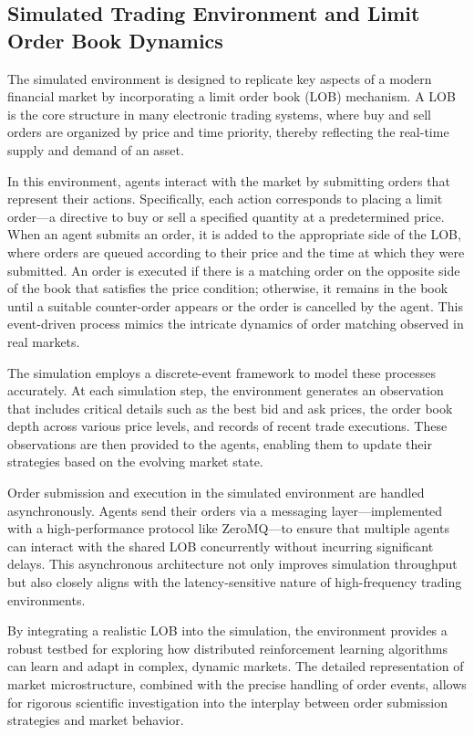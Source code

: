 \subsection{Simulated Trading Environment and Limit Order Book Dynamics}

The simulated environment is designed to replicate key aspects of a modern financial market by incorporating a limit order book (LOB) mechanism.
A LOB is the core structure in many electronic trading systems, where buy and sell orders are organized by price and time priority,
thereby reflecting the real-time supply and demand of an asset.

In this environment, agents interact with the market by submitting orders that represent their actions.
Specifically, each action corresponds to placing a limit order—a directive to buy or sell a specified quantity at a predetermined price.
When an agent submits an order, it is added to the appropriate side of the LOB, where orders are queued according to their price and
the time at which they were submitted.
An order is executed if there is a matching order on the opposite side of the book that satisfies the price condition;
otherwise, it remains in the book until a suitable counter-order appears or the order is cancelled by the agent.
This event-driven process mimics the intricate dynamics of order matching observed in real markets.

The simulation employs a discrete-event framework to model these processes accurately.
At each simulation step, the environment generates an observation that includes critical details such as the best bid and ask prices,
the order book depth across various price levels, and records of recent trade executions.
These observations are then provided to the agents, enabling them to update their strategies based on the evolving market state.

Order submission and execution in the simulated environment are handled asynchronously.
Agents send their orders via a messaging layer—implemented with a high-performance protocol like
ZeroMQ—to ensure that multiple agents can interact with the shared LOB concurrently without incurring significant delays.
This asynchronous architecture not only improves simulation throughput but also closely aligns with
the latency-sensitive nature of high-frequency trading environments.

By integrating a realistic LOB into the simulation, the environment provides a robust testbed for exploring how
distributed reinforcement learning algorithms can learn and adapt in complex, dynamic markets.
The detailed representation of market microstructure, combined with the precise handling of order events,
allows for rigorous scientific investigation into the interplay between order submission strategies and market behavior.


